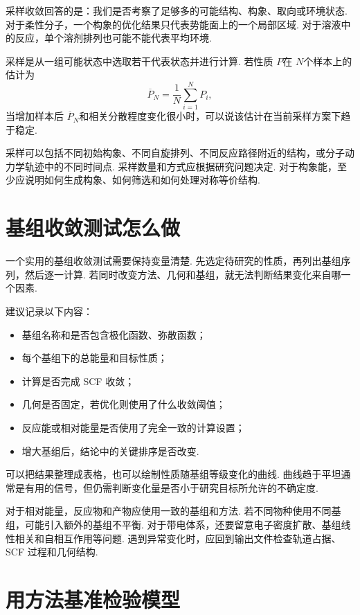 \documentclass[UTF8,11pt,a4paper,openany]{ctexbook}
\begin{document}
采样收敛回答的是：我们是否考察了足够多的可能结构、构象、取向或环境状态. 对于柔性分子，一个构象的优化结果只代表势能面上的一个局部区域. 对于溶液中的反应，单个溶剂排列也可能不能代表平均环境. 

\begin{notationbox}
采样是从一组可能状态中选取若干代表状态并进行计算. 若性质 $P$在 $N$个样本上的估计为
\[
\overline P_N=\frac{1}{N}\sum_{i=1}^{N}P_i,
\]
当增加样本后 $\overline P_N$和相关分散程度变化很小时，可以说该估计在当前采样方案下趋于稳定. 
\end{notationbox}

采样可以包括不同初始构象、不同自旋排列、不同反应路径附近的结构，或分子动力学轨迹中的不同时间点. 采样数量和方式应根据研究问题决定. 对于构象能，至少应说明如何生成构象、如何筛选和如何处理对称等价结构. 

\section{基组收敛测试怎么做}

一个实用的基组收敛测试需要保持变量清楚. 先选定待研究的性质，再列出基组序列，然后逐一计算. 若同时改变方法、几何和基组，就无法判断结果变化来自哪一个因素. 

建议记录以下内容：

\begin{itemize}
\item 基组名称和是否包含极化函数、弥散函数；
\item 每个基组下的总能量和目标性质；
\item 计算是否完成 SCF 收敛；
\item 几何是否固定，若优化则使用了什么收敛阈值；
\item 反应能或相对能量是否使用了完全一致的计算设置；
\item 增大基组后，结论中的关键排序是否改变. 
\end{itemize}

可以把结果整理成表格，也可以绘制性质随基组等级变化的曲线. 曲线趋于平坦通常是有用的信号，但仍需判断变化量是否小于研究目标所允许的不确定度. 

对于相对能量，反应物和产物应使用一致的基组和方法. 若不同物种使用不同基组，可能引入额外的基组不平衡. 对于带电体系，还要留意电子密度扩散、基组线性相关和自相互作用等问题. 遇到异常变化时，应回到输出文件检查轨道占据、SCF 过程和几何结构. 

\section{用方法基准检验模型}
\end{document}
